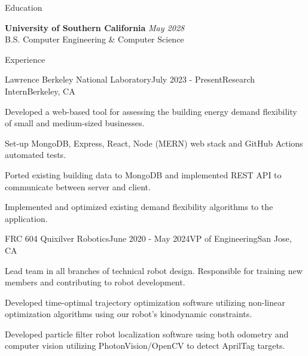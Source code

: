 \documentclass[
	11pt, %
]{tex/resume} %
\begin{document}

\begin{rSection}{Education}
	
	\textbf{University of Southern California} \hfill \textit{May 2028} \\ 
	B.S. Computer Engineering \& Computer Science
	
\end{rSection}


\begin{rSection}{Experience}

	\begin{rSubsection}{Lawrence Berkeley National Laboratory}{July 2023 - Present}{Research Intern}{Berkeley, CA}
		\item Developed a web-based tool for assessing the building energy demand flexibility of small and medium-sized businesses.
		\item Set-up MongoDB, Express, React, Node (MERN) web stack and GitHub Actions automated tests.
        \item Ported existing building data to MongoDB and implemented REST API to communicate between server and client.
        \item Implemented and optimized existing demand flexibility algorithms to the application.
        
	\end{rSubsection}


	\begin{rSubsection}{FRC 604 Quixilver Robotics}{June 2020 - May 2024}{VP of Engineering}{San Jose, CA}
		\item Lead team in all branches of technical robot design. Responsible for training new members and contributing to robot development.
        \item Developed time-optimal trajectory optimization software utilizing non-linear optimization algorithms using our robot’s kinodynamic constraints.
        \item Developed particle filter robot localization software using both odometry and computer vision utilizing PhotonVision/OpenCV to detect AprilTag targets.
        
	\end{rSubsection}





\end{rSection}
\end{document}
